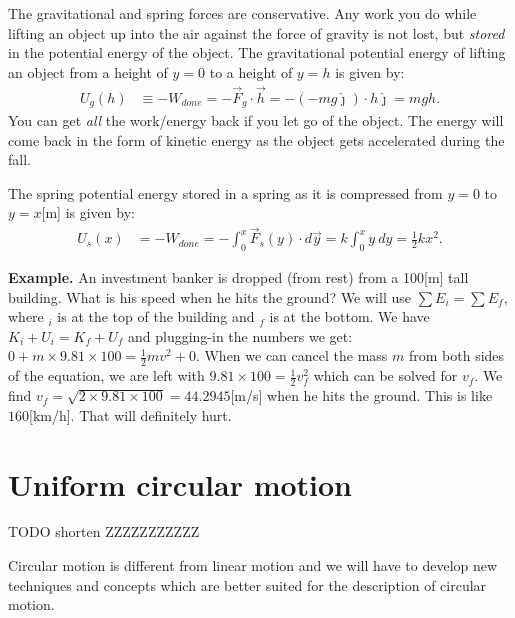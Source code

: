 \documentclass[letterpaper,9pt,journal]{IEEEtran}
\newcommand{\dokuitalic}[1]{\textsl{#1}}
\begin{document}
The gravitational and spring forces are conservative.
Any work you do while lifting an object up into the air against the force 
of gravity is not lost, but \dokuitalic{stored} in the potential energy of the object.
The gravitational potential energy of lifting an object from
a height of $y=0$ to a height of $y=h$ is given by:
\begin{align*}
  U_g(h) &\equiv - W_{done}   = - \vec{F}_g \cdot \vec{h} =  - (- mg \hat{\jmath})\cdot h\hat{\jmath} = mgh.
\end{align*}
You can get \dokuitalic{all} the work/energy back if you let go of the 
object. The energy will come back in the form of kinetic energy as the object
gets accelerated during the fall.


The spring potential energy stored in a spring as it is
compressed from $y=0$ to $y=x$[m] is given by:
\begin{align*}
 U_s(x) &= -W_{done} = -\!\int_0^x \!\vec{F}_{s}(y) \cdot d\vec{y} = k\int_0^x \!\! y\: dy  = \frac{1}{2}kx^2.
\end{align*}



{\bf Example.}
An investment banker is dropped (from rest) from a 100[m] tall building.
What is his speed when he hits the ground?
We will use $\sum E_i  =  \sum E_f$, where $_i$ is at the top of the building
and $_f$ is at the bottom. We have $K_i + U_i   =    K_f + U_f$ and
plugging-in the numbers we get: $ 0      +  m \times9.81 \times100  =    \frac{1}{2}mv^2   + 0$.
When we can cancel the mass $m$ from both sides of the equation, 
we are left with $9.81\times 100  =    \frac{1}{2}v_f^2$
which can be solved for $v_f$. 
We find $v_f =\sqrt{ 2\times 9.81\times 100}=44.2945$[m/s] when he hits the ground.
This is like $160$[km/h]. That will definitely hurt.









\section{Uniform circular motion}

TODO  shorten ZZZZZZZZZZZ


Circular motion is different from linear motion and we will have
to develop new techniques and concepts which are better suited
for the description of circular motion.

\vspace{-3mm}
\end{document}
